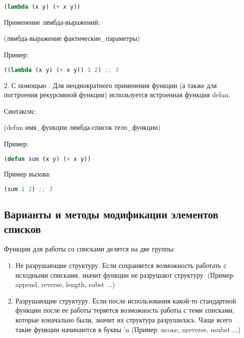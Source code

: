 \documentclass[a4paper,oneside,12pt]{extreport}
\begin{document}
\begin{lstlisting}[language=Lisp]
(lambda (x y) (+ x y))
\end{lstlisting}

Применение лямбда-выражений:

(лямбда-выражение фактические\_параметры)

Пример:

\begin{lstlisting}[language=Lisp]
((lambda (x y) (+ x y)) 1 2) ;; 3
\end{lstlisting}


2. С помощью . 
Для неоднократного применения функции (а также для построения
рекурсивной функции) используется встроенная функция defun.

Синтаксис:

(defun имя\_функции лямбда-список тело\_функции)

Пример:

\begin{lstlisting}[language=Lisp]
(defun sum (x y) (+ x y))
\end{lstlisting}

Пример вызова:

\begin{lstlisting}[language=Lisp]
(sum 1 2) ;; 3
\end{lstlisting}


\subsection*{Варианты и методы модификации элементов списков}

Функции для работы со списками делятся на две группы:

\begin{enumerate}
    \item Не разрушающие структуру. Если сохраняется возможность работать с исходными списками, значит функции не разрушают структуру.
    (Пример: append, reverse, length, subst ...)
    \item Разрушающие структуру. 
    Если после использования какой-то стандартной функции после ее работы теряется 
    возможность работы с теми списками, которые изначально были, значит их структура разрушилась. 
    Чаще всего такие функции начинаются в буквы 'n (Пример: nconc, nreverse, nsubst ...)
\end{enumerate}
\end{document}
